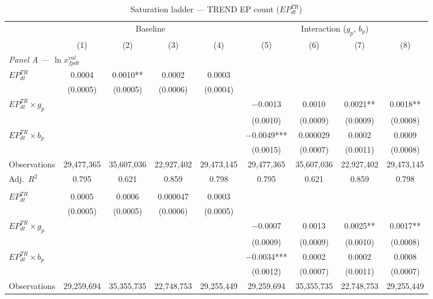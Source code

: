 \begin{table}[htbp]
\centering
\scriptsize
\setlength{\tabcolsep}{3pt}
\caption{Saturation ladder --- TREND EP count ($EP^{TR}_{dt}$)}
\label{tab:ladder_trend}
\begin{threeparttable}
\begin{tabular}{lcccccccc}
\toprule
 & \multicolumn{4}{c}{Baseline} & \multicolumn{4}{c}{Interaction ($g_p$, $b_p$)} \\
\cmidrule(lr){2-5}\cmidrule(lr){6-9}
 & (1) & (2) & (3) & (4) & (5) & (6) & (7) & (8) \\
\midrule
\multicolumn{9}{l}{\textit{Panel A --- $\ln x^{val}_{fpdt}$}} \\[3pt]
\quad $EP^{TR}_{dt}$ & 0.0004 & 0.0010** & 0.0002 & 0.0003 &  &  &  &  \\
 & (0.0005) & (0.0005) & (0.0006) & (0.0004) &  &  &  &  \\
\quad $EP^{TR}_{dt} \times g_p$ &  &  &  &  & $-$0.0013 & 0.0010 & 0.0021** & 0.0018** \\
 &  &  &  &  & (0.0010) & (0.0009) & (0.0009) & (0.0008) \\
\quad $EP^{TR}_{dt} \times b_p$ &  &  &  &  & $-$0.0049*** & 0.000029 & 0.0002 & 0.0009 \\
 &  &  &  &  & (0.0015) & (0.0007) & (0.0011) & (0.0008) \\[3pt]
Observations & 29,477,365 & 35,607,036 & 22,927,402 & 29,473,145 & 29,477,365 & 35,607,036 & 22,927,402 & 29,473,145 \\
Adj.\ $R^2$ & 0.795 & 0.621 & 0.859 & 0.798 & 0.795 & 0.621 & 0.859 & 0.798 \\
\addlinespace[6pt]
\midrule
\multicolumn{9}{l}{\textit{Panel B --- $\ln x^{qua}_{fpdt}$}} \\[3pt]
\quad $EP^{TR}_{dt}$ & 0.0005 & 0.0006 & 0.000047 & 0.0003 &  &  &  &  \\
 & (0.0005) & (0.0005) & (0.0006) & (0.0005) &  &  &  &  \\
\quad $EP^{TR}_{dt} \times g_p$ &  &  &  &  & $-$0.0007 & 0.0013 & 0.0025** & 0.0017** \\
 &  &  &  &  & (0.0009) & (0.0009) & (0.0010) & (0.0008) \\
\quad $EP^{TR}_{dt} \times b_p$ &  &  &  &  & $-$0.0034*** & 0.0002 & 0.0002 & 0.0008 \\
 &  &  &  &  & (0.0012) & (0.0007) & (0.0011) & (0.0007) \\[3pt]
Observations & 29,259,694 & 35,355,735 & 22,748,753 & 29,255,449 & 29,259,694 & 35,355,735 & 22,748,753 & 29,255,449 \\

\end{tabular}
\end{threeparttable}
\end{table}
